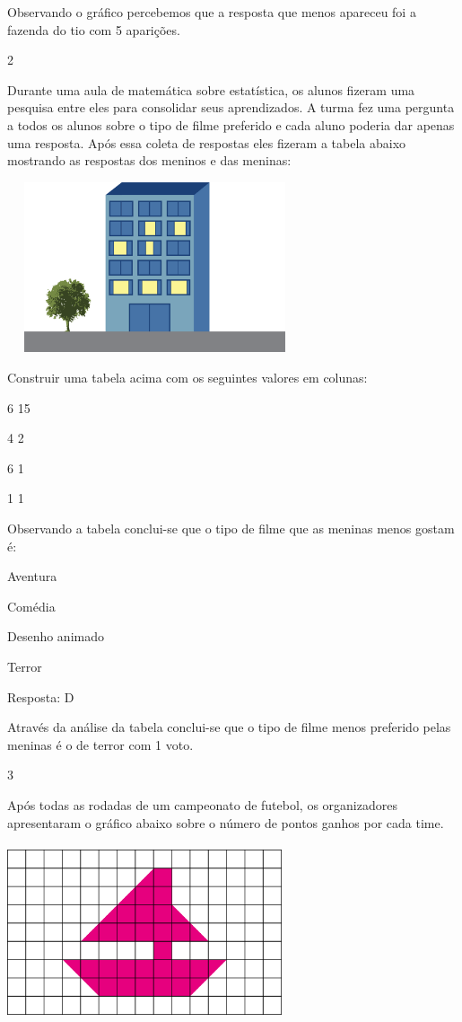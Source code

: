 \begin{escolha}
\begin{escolha}
Observando o gráfico percebemos que a resposta que menos apareceu foi a
fazenda do tio com 5 aparições.

\num{2}

Durante uma aula de matemática sobre estatística, os alunos fizeram uma
pesquisa entre eles para consolidar seus aprendizados. A turma fez uma
pergunta a todos os alunos sobre o tipo de filme preferido e cada aluno
poderia dar apenas uma resposta. Após essa coleta de respostas eles
fizeram a tabela abaixo mostrando as respostas dos meninos e das
meninas:

\includegraphics[width=3.42308in,height=1.97646in]{media/image93.png}

Construir uma tabela acima com os seguintes valores em colunas:

6 15

4 2

6 1

1 1

Observando a tabela conclui-se que o tipo de filme que as meninas menos
gostam é:

\begin{escolha}

\item
  Aventura
\item
  Comédia
\item
  Desenho animado
\item
  Terror
\end{escolha}

Resposta: D

Através da análise da tabela conclui-se que o tipo de filme menos
preferido pelas meninas é o de terror com 1 voto.

\num{3}

Após todas as rodadas de um campeonato de futebol, os organizadores
apresentaram o gráfico abaixo sobre o número de pontos ganhos por cada
time.

\includegraphics[width=3.19194in,height=2.04184in]{media/image94.png}


\end{escolha}
\end{escolha}
